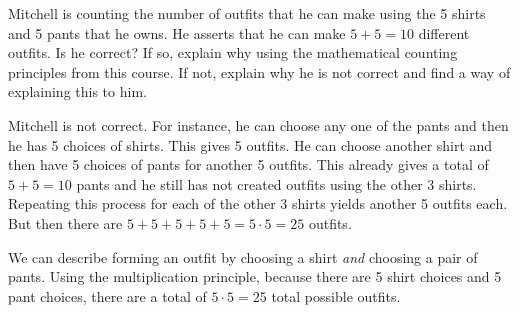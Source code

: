 \documentclass[11pt,letterpaper]{article}
\begin{document}
\newpage



 Mitchell is counting the number of outfits that he can make using the 5 shirts and 5 pants that he owns. He asserts that he can make $5 + 5= 10$ different outfits. Is he correct? If so, explain why using the mathematical counting principles from this course. If not, explain why he is not correct and find a way of explaining this to him. \pspace

\sol Mitchell is not correct. For instance, he can choose any one of the pants and then he has 5 choices of shirts. This gives 5 outfits. He can choose another shirt and then have 5 choices of pants for another 5 outfits. This already gives a total of $5 + 5= 10$ pants and he still has not created outfits using the other 3 shirts. Repeating this process for each of the other 3 shirts yields another 5 outfits each. But then there are $5 + 5 + 5 + 5 + 5= 5 \cdot 5= 25$ outfits. \pspace

We can describe forming an outfit by choosing a shirt \textit{and} choosing a pair of pants. Using the multiplication principle, because there are 5 shirt choices and 5 pant choices, there are a total of $5 \cdot 5= 25$ total possible outfits. 
\end{document}
